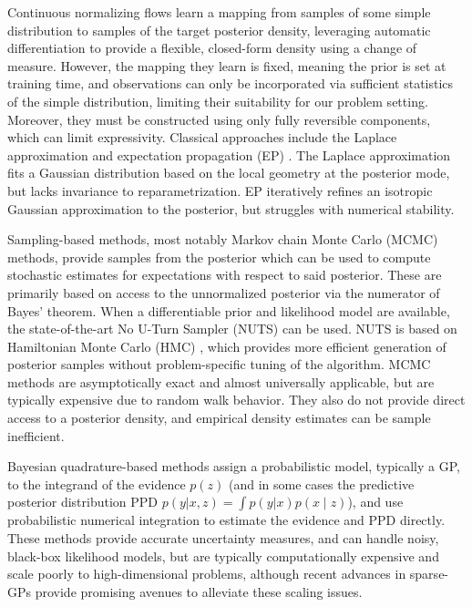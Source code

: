 Continuous normalizing flows \cite{normalizing_flows} learn a mapping from samples of some simple distribution to samples of the target posterior density, leveraging automatic differentiation to provide a flexible, closed-form density using a change of measure. However, the mapping they learn is fixed, meaning the prior is set at training time, and observations can only be incorporated via sufficient statistics of the simple distribution, limiting their suitability for our problem setting. Moreover, they must be constructed using only fully reversible components, which can limit expressivity. Classical approaches include the Laplace approximation \cite{Laplace} and expectation propagation (EP) \cite{expectation_propagation}. The Laplace approximation fits a Gaussian distribution based on the local geometry at the posterior mode, but lacks invariance to reparametrization. EP iteratively refines an isotropic Gaussian approximation to the posterior, but struggles with numerical stability.

Sampling-based methods, most notably Markov chain Monte Carlo (MCMC) methods, provide samples from the posterior which can be used to compute stochastic estimates for expectations with respect to said posterior. These are primarily based on access to the unnormalized posterior via the numerator of Bayes' theorem. When a differentiable prior and likelihood model are available, the state-of-the-art No U-Turn Sampler (NUTS) \cite{NUTS} can be used. NUTS is based on Hamiltonian Monte Carlo (HMC) \cite{HMC}, which provides more efficient generation of posterior samples without problem-specific tuning of the algorithm. MCMC methods are asymptotically exact and almost universally applicable, but are typically expensive due to random walk behavior. They also do not provide direct access to a posterior density, and empirical density estimates can be  sample inefficient.

Bayesian quadrature-based methods \cite{bayes_quad} assign a probabilistic model, typically a GP, to the integrand of the evidence $p(z)$ (and in some cases the predictive posterior distribution PPD $p(y|x,z)=\int p(y|x)p(x \mathop{|} z)$), and use probabilistic numerical integration to estimate the evidence and PPD directly. These methods provide accurate uncertainty measures, and can handle noisy, black-box likelihood models, but are typically computationally expensive and scale poorly to high-dimensional problems, although recent advances in sparse-GPs \cite{sparse_gp} provide promising avenues to alleviate these scaling issues.

